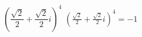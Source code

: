 { $\left(\dfrac{\sqrt{2}}{2} + \dfrac{\sqrt{2}}{2} i\right)^4$}
{ $\left(\frac{\sqrt{2}}{2} + \frac{\sqrt{2}}{2} i\right)^4=-1$}
